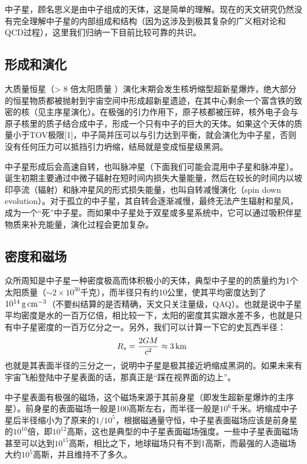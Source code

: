 

中子星，顾名思义是由中子组成的天体，这是简单的理解。现在的天文研究仍然没有完全理解中子星的内部组成和结构（因为这涉及到极其复杂的广义相对论和QCD过程），这里我们归纳一下目前比较可靠的共识。

\subsection{形成和演化}
大质量恒星（> 8 倍太阳质量 ）演化末期会发生核坍缩型超新星爆炸，绝大部分的恒星物质都被抛射到宇宙空间中形成超新星遗迹，在其中心剩余一个富含铁的致密的核（见主序星演化）。在极强的引力作用下，原子核都被压碎，核外电子会与原子核里的质子结合成中子，形成一个只有中子的巨大的天体。如果这个天体的质量小于TOV极限[1]，中子简并压可以与引力达到平衡，就会演化为中子星，否则没有任何压力可以抵挡引力坍缩，结局就是变成恒星级黑洞。

中子星形成后会高速自转，也叫脉冲星（下面我们可能会混用中子星和脉冲星）。诞生初期主要通过中微子辐射在短时间内损失大量能量，然后在较长的时间内以坡印亭流（辐射）和脉冲星风的形式损失能量，也叫自转减慢演化（spin down evolution）。对于孤立的中子星，其自转会逐渐减慢，最终无法产生辐射和星风，成为一个“死”中子星。而如果中子星处于双星或多星系统中，它可以通过吸积伴星物质来补充能量，演化过程会更加复杂。

\subsection{密度和磁场}
众所周知是中子星一种密度极高而体积极小的天体，典型中子星的的质量约为1个太阳质量（$\sim 2\times10^{30}$千克），而半径只有约10公里，使其平均密度达到了$\rm 10^{14} \, g \, cm^{-3}$（不要纠结算的是否精确，天文只关注量级，QAQ）。也就是说中子星平均密度是水的一百万亿倍，相比较一下，太阳的密度其实跟水差不多，也就是只有中子星密度的一百万亿分之一。另外，我们可以计算一下它的史瓦西半径：
\begin{equation}
R_{s} = \frac{2GM}{c^2} \approx 3 \, {\rm km} ~
\end{equation}
也就是其表面半径的三分之一，说明中子星是极其接近坍缩成黑洞的。如果未来有宇宙飞船登陆中子星表面的话，那真正是“踩在视界面的边上”。

中子星表面有极强的磁场，这个磁场来源于其前身星（即发生超新星爆炸的主序星）。前身星的表面磁场一般是100高斯左右，而半径一般是$10^6$千米。坍缩成中子星后半径缩小为了原来的$1/10^5$，根据磁通量守恒，中子星表面磁场应该是前身星的$10^{10}$倍，即$10^{12}$高斯，这也是典型的中子星表面磁场强度。一些中子星表面磁场甚至可以达到$10^{15}$高斯，相比之下，地球磁场只有不到1高斯，而最强的人造磁场大约$10^5$高斯，并且维持不了多久。

